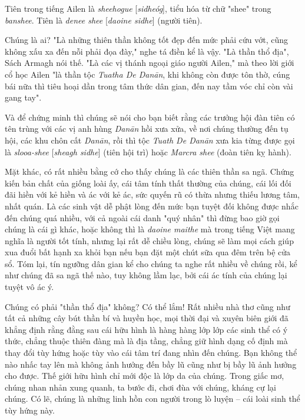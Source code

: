 Tiên trong tiếng Ailen là \textit{sheehogue} [\textit{sidheóg}], tiểu hóa từ chữ "shee" trong \textit{banshee}. Tiên là \textit{denee shee} [\textit{daoine sidhe}] (người tiên).

Chúng là ai? "Là những thiên thần không tốt đẹp đến mức phải cứu vớt, cũng không xấu xa đến nỗi phải đọa đày," nghe tá điền kể là vậy. "Là thần thổ địa", Sách Armagh nói thế. "Là các vị thánh ngoại giáo người Ailen," mà theo lời giới cổ học Ailen "là thần tộc \textit{Tuatha De Danān}, khi không còn được tôn thờ, cúng bái nữa thì tiêu hoại dần trong tâm thức dân gian, đến nay tầm vóc chỉ còn vài gang tay".

Và để chứng minh thì chúng sẽ nói cho bạn biết rằng các trưởng hội đàn tiên có tên trùng với các vị anh hùng \textit{Danān} hồi xưa xửa, về nơi chúng thường đến tụ hội, các khu chôn cất \textit{Danān}, rồi thì tộc \textit{Tuath De Danān} xưa kia từng được gọi là \textit{slooa-shee} [\textit{sheagh sidhe}] (tiên hội trì) hoặc \textit{Marcra shee} (đoàn tiên kỵ hành).

Mặt khác, có rất nhiều bằng cớ cho thấy chúng là các thiên thần sa ngã. Chứng kiến bản chất của giống loài ấy, cái tâm tính thất thường của chúng, cái lối đối đãi hiền với kẻ hiền và ác với kẻ ác, sức quyến rũ có thừa nhưng thiếu lương tâm, nhất quán. Là các sinh vật dễ phật lòng đến mức bạn tuyệt đối không được nhắc đến chúng quá nhiều, với cả ngoài cái danh "quý nhân" thì đừng bao giờ gọi chúng là cái gì khác, hoặc không thì là \textit{daoine maithe} mà trong tiếng Việt mang nghĩa là người tốt tính, nhưng lại rất dễ chiều lòng, chúng sẽ làm mọi cách giúp xua đuổi bất hạnh xa khỏi bạn nếu bạn đặt một chút sữa qua đêm trên bệ cửa sổ. Tóm lại, tín ngưỡng dân gian kể cho chúng ta nghe rất nhiều về chúng rồi, kể như chúng đã sa ngã thế nào, tuy không lầm lạc, bởi cái ác tính của chúng lại tuyệt vô ác ý.

Chúng có phải "thần thổ địa" không? Có thể lắm! Rất nhiều nhà thơ cũng như tất cả những cây bút thần bí và huyền học, mọi thời đại và xuyên biên giới đã khẳng định rằng đằng sau cái hữu hình là hàng hàng lớp lớp các sinh thể có ý thức, chẳng thuộc thiên đàng mà là địa tầng, chẳng giữ hình dạng cố định mà thay đổi tùy hứng hoặc tùy vào cái tâm trí đang nhìn đến chúng. Bạn không thể nào nhấc tay lên mà không ảnh hưởng đến bầy lũ cũng như bị bầy lũ ảnh hưởng cho được. Thế giới hữu hình chỉ mới độc là lớp da của chúng. Trong giấc mơ, chúng nhan nhản xung quanh, ta bước đi, chơi đùa với chúng, kháng cự lại chúng. Có lẽ, chúng là những linh hồn con người trong lò luyện – cái loài sinh thể tùy hứng này.

